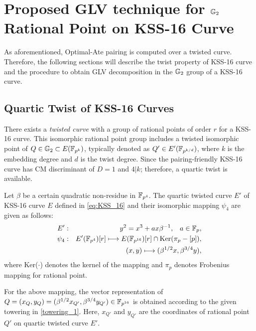 \section{Proposed GLV technique for \texorpdfstring{${\mathbb{G}}_{2}$}{} Rational Point on  KSS-16 Curve}
\label{Proposal}
As aforementioned, Optimal-Ate pairing is computed over a twisted curve. 
Therefore, the following sections will describe the twist property of KSS-16 curve and the procedure to obtain GLV decomposition in the ${\mathbb{G}}_{2}$ group of a KSS-16 curve.

\subsection{Quartic Twist of KSS-16 Curves} 
\label{eq:quartic_twist_candar18_kss16}
There exists a \textit{twisted curve} with a group of rational points of order $r$ for a KSS-16 curve. 
This isomorphic rational point group includes a twisted isomorphic point of $Q \in {\mathbb{G}}_{2} \subset E(\mathbb{F}_{p^k})$, typically denoted as $Q' \in E'(\mathbb{F}_{p^{k/d}})$, where $k$ is the embedding degree and $d$ is the twist degree.  
Since the pairing-friendly KSS-16 \cite{EPRINT:KacSchSco07} curve has CM discriminant of $D = 1$ and $4|k$; therefore, a quartic twist is available.

Let $\beta$ be a certain quadratic non-residue in $\mathbb{F}_{p^4}$.  The quartic twisted curve $E'$ of KSS-16  curve $E$ defined in \eqref{eq:KSS_16} and  their isomorphic mapping $\psi_4$ are given as follows:
\begin{eqnarray} 
	E'&:&y^2=x^3+ax\beta^{-1},\;\;\;a\in{\mathbb{F}}_{p}, \label{twisted_E} \\ 
	\psi_4&:&E'(\mathbb{F}_{p^4})[r] \longmapsto E(\mathbb{F}_{p^{16}})[r]\cap {\rm Ker}(\pi_p-[p]),\nonumber\\
	&& \quad \quad (x,y)\longmapsto (\beta^{1/2}x,\beta^{3/4}y),
\end{eqnarray}
where Ker($\cdot$) denotes the kernel of the mapping and $\pi_p$ denotes Frobenius mapping  for rational point.

For the above mapping, the vector representation of $Q = (x_{Q},y_Q) = (\beta^{1/2}x_{Q'},\beta^{3/4}y_{Q'}) \in \mathbb{F}_{p^{16}}$ is obtained according to the given towering in \eqref{towering_1}.
Here, $x_{Q'}$ and $y_{Q'}$ are the coordinates of rational point $Q'$ on quartic twisted curve $E'$. 




